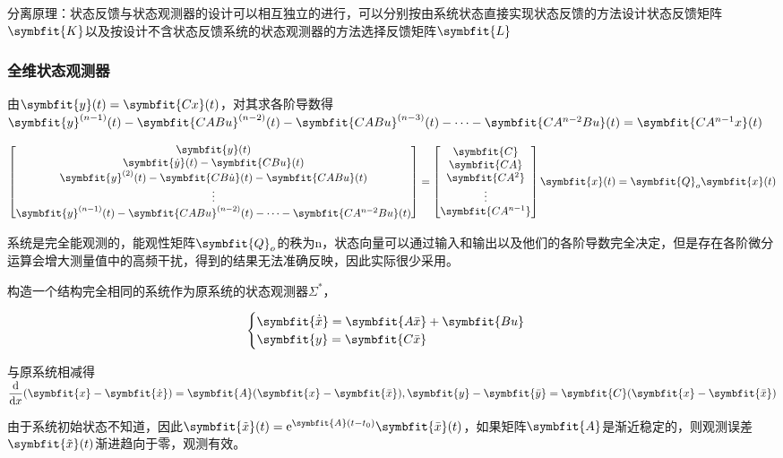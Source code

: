 \documentclass[11pt,a4paper]{ctexart}
\renewcommand{\d}{{\rm d}}
\newcommand{\e}{{\rm e}}
\newcommand{\bm}{\symbfit}
\begin{document}
        分离原理：状态反馈与状态观测器的设计可以相互独立的进行，可以分别按由系统状态直接实现状态反馈的方法设计状态反馈矩阵$\bm{K}$以及按设计不含状态反馈系统的状态观测器的方法选择反馈矩阵$\bm{L}$
        \subsubsection{全维状态观测器}
            由$\bm{y}(t)=\bm{Cx}(t)$，对其求各阶导数得$\bm{y}^{(n-1)}(t)-\bm{CABu}^{(n-2)}(t)-\bm{CABu}^{(n-3)}(t)-\cdots-\bm{CA^{n-2}Bu}(t)=\bm{CA^{n-1}x}(t)$

            \[
            \begin{bmatrix}
                \bm{y}(t)\\ \bm{\dot y}(t)-\bm{CBu}(t)\\ \bm{y}^{(2)}(t)-\bm{CB\dot u}(t)-\bm{CABu}(t)\\ \vdots \\
                \bm{y}^{(n-1)}(t)-\bm{CABu}^{(n-2)}(t)-\cdots-\bm{CA^{n-2}Bu}(t)
            \end{bmatrix}
            =\begin{bmatrix}\bm{C}\\ \bm{CA} \\ \bm{CA^2} \\ \vdots \\ \bm{CA^{n-1}}\end{bmatrix}\bm{x}(t)
            =\bm{Q}_o\bm{x}(t)
            \]

            系统是完全能观测的，能观性矩阵$\bm{Q}_o$的秩为n，状态向量可以通过输入和输出以及他们的各阶导数完全决定，但是存在各阶微分运算会增大测量值中的高频干扰，得到的结果无法准确反映，因此实际很少采用。

            构造一个结构完全相同的系统作为原系统的状态观测器$\Sigma^*$，

            \[
            \begin{cases}
            \bm{\dot{\bar x}}=\bm{A\bar x}+\bm{Bu}\\
            \bm{y}=\bm{C\bar x}
            \end{cases}
            \]

            与原系统相减得$\dfrac{\d}{\d x}(\bm{x}-\bm{\dot x})=\bm{A}(\bm{x}-\bm{\bar x}),\bm{y}-\bm{\bar y}=\bm{C}(\bm{x}-\bm{\bar x})$

            由于系统初始状态不知道，因此$\bm{\tilde x}(t)=\e^{\bm{A}(t-t_0)}\bm{\bar x}(t)$，如果矩阵$\bm{A}$是渐近稳定的，则观测误差$\bm{\tilde x}(t)$渐进趋向于零，观测有效。
\end{document}
